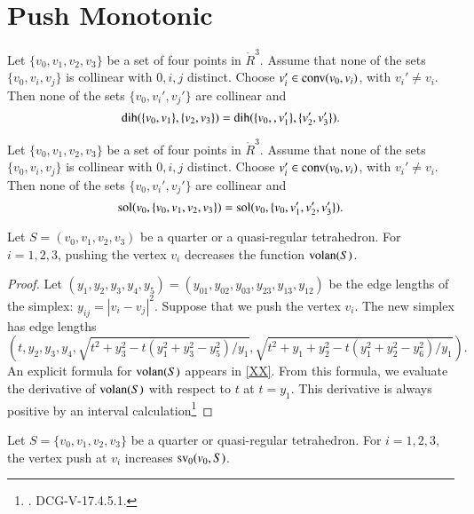 \section{Push Monotonic}


\begin{lemma}
Let $\{v_0,v_1,v_2,v_3\}$ be a set of four points in $\ring{R}^3$.
Assume that none of the sets $\{v_0,v_i,v_j\}$ is collinear with
$0,i,j$ distinct.   Choose
$v'_i\in{\operatorname{conv}}(v_0,v_i)$, with $v_i'\ne v_i$.  Then
none of the sets $\{v_0,v_i',v_j'\}$ are collinear and
  $$\operatorname{dih}(\{v_0,v_1\},\{v_2,v_3\}) = \operatorname{dih}(\{v_0,,v'_1\},\{v'_2,v'_3\}).$$
\end{lemma}

\begin{lemma}
Let $\{v_0,v_1,v_2,v_3\}$ be a set of four points in $\ring{R}^3$.
Assume that none of the sets $\{v_0,v_i,v_j\}$ is collinear with
$0,i,j$ distinct.   Choose
$v'_i\in{\operatorname{conv}}(v_0,v_i)$, with $v_i'\ne v_i$.  Then
none of the sets $\{v_0,v_i',v_j'\}$ are collinear and
  $$\operatorname{sol}(v_0,\{v_0,v_1,v_2,v_3\}) = \operatorname{sol}(v_0,\{v_0,v'_1,v'_2,v'_3\}).$$
\end{lemma}


\begin{lemma}  
Let $S= (v_0,v_1,v_2,v_3)$ be a quarter
or a quasi-regular tetrahedron.  For  $i=1,2,3$,
pushing the vertex $v_i$ decreases the function ${\operatorname{volan}}(S)$.
\end{lemma}

\begin{proof}  
Let $(y_1,y_2,y_3,y_4,y_5) = (y_{01},y_{02},y_{03},y_{23},y_{13},y_{12})$ 
be the edge lengths of the simplex: $y_{ij} = |v_i-v_j|^2$.
Suppose that we push the vertex $v_i$.  The new simplex has edge
lengths
$$
\left(t,y_2,y_3,y_4,\sqrt{t^2+y_3^2 - t(y_1^2+y_3^2-y_5^2)/y_1},
\sqrt{t^2 + y_1 + y_2^2 - t(y_1^2+y_2^2-y_6^2)/y_1}\right).
$$
An explicit formula for ${\operatorname{volan}}(S)$ appears in
\ref{XX}.  From this formula, 
we evaluate the derivative of ${\operatorname{volan}}(S)$ with respect
to $t$ at $t=y_1$.   This derivative is always positive by
an interval calculation\footnote{.  DCG-V-17.4.5.1.}
\end{proof}

\begin{lemma}
Let $S=\{v_0,v_1,v_2,v_3\}$ be a quarter or quasi-regular tetrahedron.
For $i=1,2,3$, the vertex push at $v_i$ increases
${\operatorname{sv}}_0(v_0,S)$.
\end{lemma}


